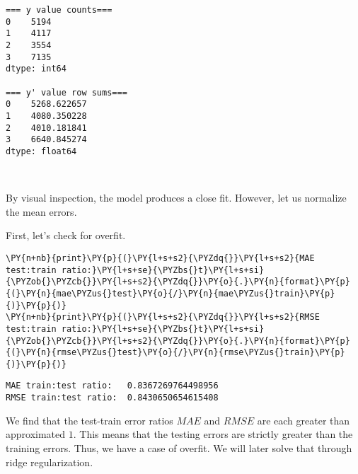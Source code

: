     \begin{Verbatim}[commandchars=\\\{\}]
=== y value counts===
0    5194
1    4117
2    3554
3    7135
dtype: int64

=== y' value row sums===
0    5268.622657
1    4080.350228
2    4010.181841
3    6640.845274
dtype: float64

    \end{Verbatim}

    \begin{center}
    \end{center}
    { \hspace*{\fill} \\}
    
    By visual inspection, the model produces a close fit. However, let us
normalize the mean errors.

First, let's check for overfit.

    \begin{tcolorbox}[breakable, size=fbox, boxrule=1pt, pad at break*=1mm,colback=cellbackground, colframe=cellborder]
\begin{Verbatim}[commandchars=\\\{\}]
\PY{n+nb}{print}\PY{p}{(}\PY{l+s+s2}{\PYZdq{}}\PY{l+s+s2}{MAE test:train ratio:}\PY{l+s+se}{\PYZbs{}t}\PY{l+s+si}{\PYZob{}\PYZcb{}}\PY{l+s+s2}{\PYZdq{}}\PY{o}{.}\PY{n}{format}\PY{p}{(}\PY{n}{mae\PYZus{}test}\PY{o}{/}\PY{n}{mae\PYZus{}train}\PY{p}{)}\PY{p}{)}
\PY{n+nb}{print}\PY{p}{(}\PY{l+s+s2}{\PYZdq{}}\PY{l+s+s2}{RMSE test:train ratio:}\PY{l+s+se}{\PYZbs{}t}\PY{l+s+si}{\PYZob{}\PYZcb{}}\PY{l+s+s2}{\PYZdq{}}\PY{o}{.}\PY{n}{format}\PY{p}{(}\PY{n}{rmse\PYZus{}test}\PY{o}{/}\PY{n}{rmse\PYZus{}train}\PY{p}{)}\PY{p}{)}
\end{Verbatim}
\end{tcolorbox}

    \begin{Verbatim}[commandchars=\\\{\}]
MAE train:test ratio:   0.8367269764498956
RMSE train:test ratio:  0.8430650654615408
    \end{Verbatim}

    We find that the test-train error ratios \(M\!A\!E\) and \(R\!M\!S\!E\)
are each greater than approximated \(1\). This means that the testing
errors are strictly greater than the training errors. Thus, we have a
case of overfit. We will later solve that through ridge regularization.

